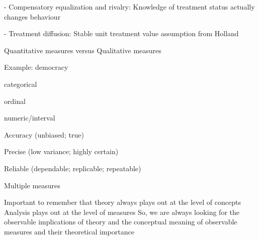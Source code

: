 - Compensatory equalization and rivalry: Knowledge of treatment status actually changes behaviour

- Treatment diffusion: Stable unit treatment value assumption from Holland



Quantitative measures versus Qualitative measures

Example: democracy

categorical

ordinal

numeric/interval



Accuracy (unbiased; true)

Precise (low variance; highly certain)

Reliable (dependable; replicable; repeatable)



Multiple measures


Important to remember that theory always plays out at the level of concepts
Analysis plays out at the level of measures
So, we are always looking for the observable implications of theory and the conceptual meaning of observable measures and their theoretical importance



\appendix
\frame{}


